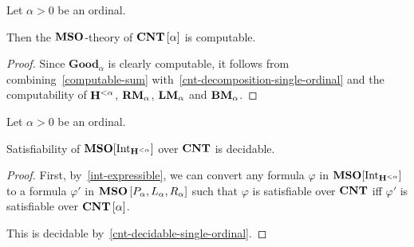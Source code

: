 \begin{lemma}\label{cnt-decidable-single-ordinal}
  Let $\alpha > 0$ be an ordinal.

  Then the $\mathbf{MSO}$-theory of $\mathbf{CNT} \left[ {\alpha} \right]$ is computable.
\end{lemma}

\begin{proof}
  Since $\mathbf{Good}_{\alpha}$ is clearly computable,
  it follows from combining~\cref{computable-sum}
  with~\cref{cnt-decomposition-single-ordinal}
  and the computability of $\mathbf{H}^{< \alpha}$,
  $\mathbf{RM}_{\alpha}$, $\mathbf{LM}_{\alpha}$ and $\mathbf{BM}_{\alpha}$.
\end{proof}

\begin{theorem}\label{single-ordinal-satisfiability}
  Let $\alpha > 0$ be an ordinal.

  Satisfiability of $\mathbf{MSO}[\mathrm{Int}_{\mathbf{H}^{< \alpha}}]$
  over $\mathbf{CNT}$ is decidable.
\end{theorem}

\begin{proof}
  First, by~\cref{int-expressible}, we can convert
  any formula $\varphi$ in $\mathbf{MSO}[\mathrm{Int}_{\mathbf{H}^{< \alpha}}]$
  to a formula $\varphi'$ in $\mathbf{MSO} \left[ {P_\alpha, L_\alpha, R_\alpha} \right]$
  such that $\varphi$ is satisfiable over $\mathbf{CNT}$
  iff $\varphi'$ is satisfiable over $\mathbf{CNT} \left[ {\alpha} \right]$.

  This is decidable by~\cref{cnt-decidable-single-ordinal}.
\end{proof}
